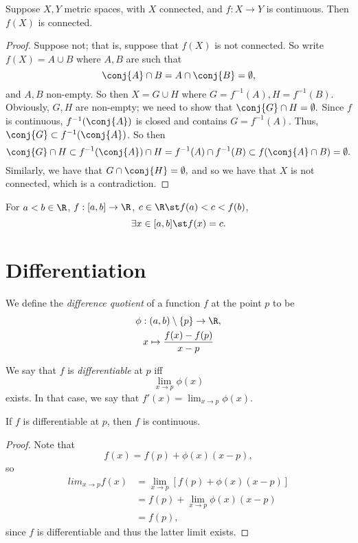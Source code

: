\documentclass{notes}
\begin{document}
\begin{theorem}
  Suppose $X,Y$ metric spaces, with $X$ connected, and $f: X\to Y$ is continuous. Then $f(X)$ is
  connected.
\end{theorem}
\begin{proof}
  Suppose not; that is, suppose that $f(X)$ is not connected. So write $f(X) = A\cup B$ where $A,B$
  are such that $$\conj{A} \cap B = A \cap \conj{B} = \emptyset,$$ and $A,B$ non-empty. So then $X =
  G \cup H$ where $G = f^{-1}(A), H = f^{-1}(B)$. Obviously, $G,H$ are non-empty; we need to show
  that $\conj{G} \cap H = \emptyset.$ Since $f$ is continuous, $f^{-1}(\conj{A})$ is closed and
  contains $G = f^{-1}(A)$. Thus, $\conj{G} \subset f^{-1}(\conj{A})$. So then $$\conj{G} \cap H
  \subset f^{-1}(\conj{A}) \cap H = f^{-1}(A) \cap f^{-1}(B) \subset f(\conj{A} \cap B) =
  \emptyset.$$ Similarly, we have that $G\cap\conj{H} = \emptyset,$ and so we have that $X$ is not
  connected, which is a contradiction.
\end{proof}

\begin{corollary}
  For $a<b \in \R$, $f: [a,b] \to \R$, $c\in\R \st f(a) < c < f(b)$, $$\exists x\in [a,b] \st f(x) =
  c.$$
\end{corollary}

\section{Differentiation}
\begin{defn}
  We define the \emph{difference quotient} of a function $f$ at the point $p$ to be
  \begin{gather*}
    \phi: (a,b) \setminus \{p\} \to \R, \\
    x \mapsto \frac{f(x) - f(p)}{x - p}
  \end{gather*}
\end{defn}

\begin{defn}[Differentiability]
  We say that $f$ is \emph{differentiable} at $p$ iff $$\lim_{x\to p} \phi(x)$$ exists. In that case,
  we say that $f'(x) = \lim_{x\to p} \phi(x)$.
\end{defn}

\begin{theorem}
  If $f$ is differentiable at $p$, then $f$ is continuous.
\end{theorem}
\begin{proof}
  Note that $$f(x) = f(p) + \phi(x)(x-p),$$ so 
  \begin{align*}
    lim_{x\to p} f(x) &= \lim_{x\to p} \left[ f(p) + \phi(x)(x-p) \right] \\
                      &= f(p) + \lim_{x\to p} \phi(x)(x-p) \\
                      &= f(p),
  \end{align*}
  since $f$ is differentiable and thus the latter limit exists.
\end{proof}
\end{document}
